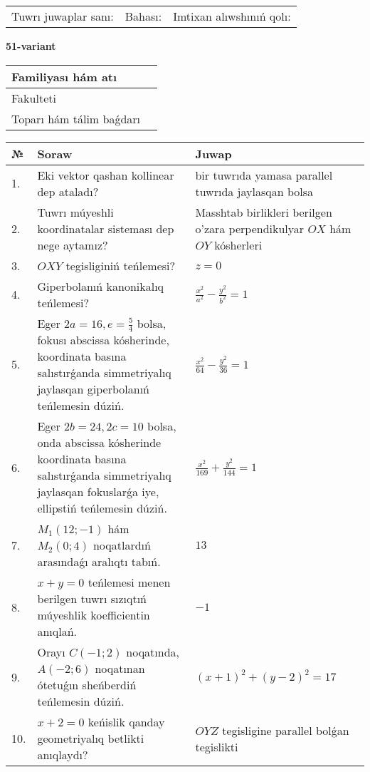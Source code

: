 \documentclass{article}
\begin{document}
\vspace{1cm}

\begin{tabular}{lll}
Tuwrı juwaplar sanı: \underline{\hspace{1.5cm}} & 
Bahası: \underline{\hspace{1.5cm}} & 
Imtixan alıwshınıń qolı: \underline{\hspace{2cm}} \\
\end{tabular}

\egroup

\newpage


\textbf{51-variant}\\

\bgroup
\def\arraystretch{1.6} %

\begin{tabular}{|m{5.7cm}|m{9.5cm}|}
\hline
Familiyası hám atı & \\
\hline
Fakulteti  & \\
\hline
Toparı hám tálim baǵdarı  & \\
\hline
\end{tabular}

\vspace{1cm}

\begin{tabular}{|m{0.7cm}|m{10cm}|m{4cm}|}
\hline
№ & Soraw & Juwap \\
\hline
1. & Eki vektor qashan kollinear dep ataladı? & bir tuwrıda yamasa parallel tuwrıda jaylasqan bolsa \\
\hline
2. & Tuwrı múyeshli koordinatalar sisteması dep nege aytamız? & Masshtab birlikleri berilgen o'zara perpendikulyar $OX$ hám $OY$ kósherleri \\
\hline
3. & $OXY$ tegisliginiń teńlemesi? & $z=0$ \\
\hline
4. & Giperbolanıń kanonikalıq teńlemesi? & $\frac{x^2}{a^2}-\frac{y^2}{b^2}=1$ \\
\hline
5. & Eger $2a=16, e=\frac{5}{4}$ bolsa, fokusı abscissa kósherinde, koordinata basına salıstırǵanda simmetriyalıq jaylasqan giperbolanıń teńlemesin dúziń. & $\frac{x^{2}}{64}-\frac{y^{2}}{36}=1$ \\
\hline
6. & Eger $2b=24, 2 c=10$ bolsa, onda abscissa kósherinde koordinata basına salıstırǵanda simmetriyalıq jaylasqan fokuslarǵa iye, ellipstiń teńlemesin dúziń. & $\frac{x^{2}}{169}+\frac{y^{2}}{144}=1$ \\
\hline
7. & $M_{1} (12;-1)$ hám $M_{2} (0;4)$ noqatlardıń arasındaǵı aralıqtı tabıń. & $13$ \\
\hline
8. & $x+y=0$ teńlemesi menen berilgen tuwrı sızıqtıń múyeshlik koefficientin anıqlań. & $- 1$ \\
\hline
9. & Orayı $C (-1;2)$ noqatında, $A (-2;6 )$ noqatınan ótetuǵın sheńberdiń teńlemesin dúziń. & $(x+1)^{2}+(y-2)^{2}=17$ \\
\hline
10. & $x+2=0$ keńislik qanday geometriyalıq betlikti anıqlaydı? &  $OYZ$ tegisligine parallel bolǵan tegislikti \\
\hline
\end{tabular}
\end{document}
